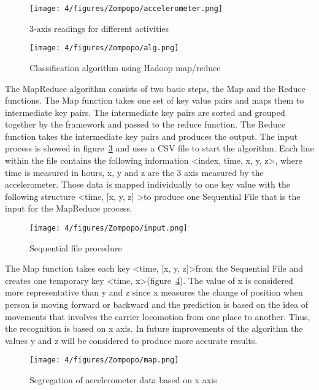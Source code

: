 \begin{figure}
\centering
\texttt{[image: 4/figures/Zompopo/accelerometer.png]}
\caption{3-axis readings for different activities}
\label{fig:accelerometer}
\end{figure}

\begin{figure}
\centering
\texttt{[image: 4/figures/Zompopo/alg.png]}
\caption{Classification algorithm using Hadoop map/reduce}
\label{fig:alg}
\end{figure}

The MapReduce algorithm consists of two basic steps, the Map and the Reduce functions. The Map function takes one set of key value pairs and maps them to intermediate key pairs. The intermediate key pairs are sorted and grouped together by the framework and passed to the reduce function. The Reduce function takes the intermediate key pairs and produces the output. The input process is showed in figure~\ref{fig:input} and uses a CSV file to start the algorithm. Each line within the file contains the following information \textless index, time, x, y, z\textgreater, where time is measured in hours, x, y and z are the 3 axis measured by the accelerometer. Those data is mapped individually to one key value with the following structure \textless time, [x, y, z] \textgreater to produce one Sequential File that is the input for the MapReduce process.

\begin{figure}
\centering
\texttt{[image: 4/figures/Zompopo/input.png]}
\caption{Sequential file procedure}
\label{fig:input}
\end{figure}

The Map function takes each key \textless time, [x, y, z]\textgreater from the Sequential File and creates one temporary key \textless time, x\textgreater (figure~\ref{fig:map}). The value of x is considered more representative than y and z since x measures the change of position when person is moving forward or backward and the prediction is based on the idea of movements that involves the carrier locomotion from one place to another. Thus, the recognition is based on x axis. In future improvements of the algorithm the values y and z will be considered to produce more accurate results.

\begin{figure}
\centering
\texttt{[image: 4/figures/Zompopo/map.png]}
\caption{Segregation of accelerometer data based on x axis}
\label{fig:map}
\end{figure}


